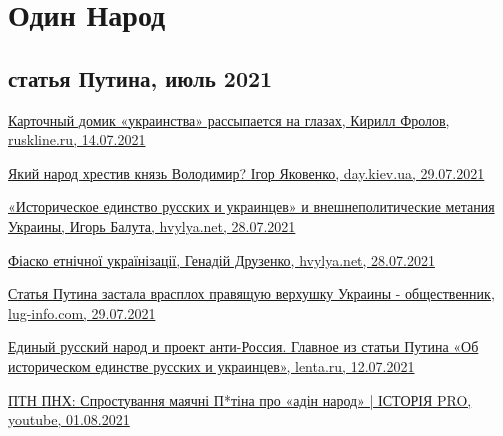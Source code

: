  
 
 
 
 
\chapter{Один Народ}

\section{статья Путина, июль 2021}


\href{https://ruskline.ru/news_rl/2021/07/14/kartochnyi_domik_ukrainstva_rassypaetsya_na_glazah}{%
Карточный домик «украинства» рассыпается на глазах, Кирилл Фролов, ruskline.ru, 14.07.2021%
}

\href{https://day.kyiv.ua/uk/blog/suspilstvo/yakyy-narod-hrestyv-knyaz-volodymyr}{%
Який народ хрестив князь Володимир? Ігор Яковенко, day.kiev.ua, 29.07.2021%
}

\href{https://analytics.hvylya.net/234637-istoricheskoe-edinstvo-russkih-i-ukraincev-i-vneshnepoliticheskie-metaniya-ukrainy}{%
«Историческое единство русских и украинцев» и внешнеполитические метания Украины, Игорь Балута, hvylya.net, 28.07.2021%
}

\href{https://analytics.hvylya.net/234631-fiasko-etnichnoji-ukrajinizaciji}{%
Фіаско етнічної українізації, Генадій Друзенко, hvylya.net, 28.07.2021%
}

\href{https://lug-info.com/news/stat-a-putina-zastala-vrasploh-pravasuu-verhusku-ukrainy-obsestvennik}{%
Статья Путина застала врасплох правящую верхушку Украины - общественник, lug-info.com, 29.07.2021%
}

\href{https://lenta.ru/brief/2021/07/12/odin_narod/}{%
Единый русский народ и проект анти-Россия. Главное из статьи Путина «Об историческом единстве русских и украинцев», %
lenta.ru, 12.07.2021%
}

\href{https://www.youtube.com/watch?v=E2f7VreiQjU}{%
ПТН ПНХ: Спростування маячні П*тіна про «адін народ» | ІСТОРІЯ PRO, youtube, 01.08.2021%
}

